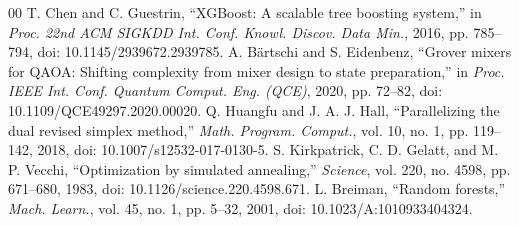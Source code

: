 \documentclass[conference]{IEEEtran}
\begin{document}
\begin{thebibliography}{00}
 T. Chen and C. Guestrin, ``XGBoost: A scalable tree boosting system,'' in \textit{Proc. 22nd ACM SIGKDD Int. Conf. Knowl. Discov. Data Min.}, 2016, pp. 785--794, doi: 10.1145/2939672.2939785.
 A. B\"{a}rtschi and S. Eidenbenz, ``Grover mixers for QAOA: Shifting complexity from mixer design to state preparation,'' in \textit{Proc. IEEE Int. Conf. Quantum Comput. Eng. (QCE)}, 2020, pp. 72--82, doi: 10.1109/QCE49297.2020.00020.
 Q. Huangfu and J. A. J. Hall, ``Parallelizing the dual revised simplex method,'' \textit{Math. Program. Comput.}, vol. 10, no. 1, pp. 119--142, 2018, doi: 10.1007/s12532-017-0130-5.
 S. Kirkpatrick, C. D. Gelatt, and M. P. Vecchi, ``Optimization by simulated annealing,'' \textit{Science}, vol. 220, no. 4598, pp. 671--680, 1983, doi: 10.1126/science.220.4598.671.
 L. Breiman, ``Random forests,'' \textit{Mach. Learn.}, vol. 45, no. 1, pp. 5--32, 2001, doi: 10.1023/A:1010933404324.
\end{thebibliography}
\end{document}
